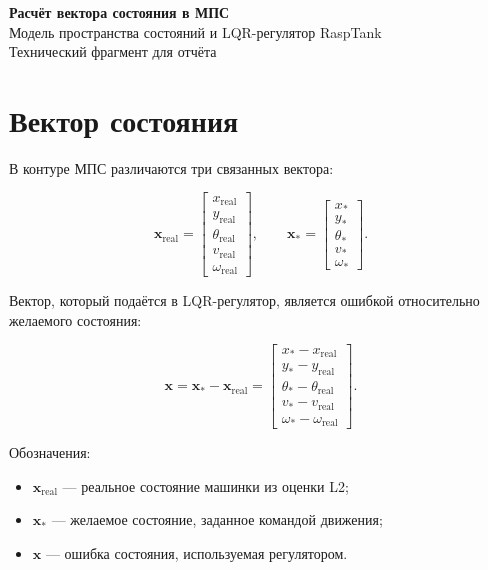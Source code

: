 \documentclass[12pt,a4paper]{article}
\newcommand{\vect}[1]{\mathbf{#1}}
\begin{document}
\begin{center}
  {\LARGE\bfseries Расчёт вектора состояния в МПС}\\[4pt]
  {\large Модель пространства состояний и LQR-регулятор RaspTank}\\[10pt]
  {\color{muted}Технический фрагмент для отчёта}
\end{center}

\vspace{8pt}

\section{Вектор состояния}

В контуре МПС различаются три связанных вектора:

\[
\vect{x}_{\mathrm{real}}
=
\begin{bmatrix}
x_{\mathrm{real}} \\
y_{\mathrm{real}} \\
\theta_{\mathrm{real}} \\
v_{\mathrm{real}} \\
\omega_{\mathrm{real}}
\end{bmatrix},
\qquad
\vect{x}_{*}
=
\begin{bmatrix}
x_{*} \\
y_{*} \\
\theta_{*} \\
v_{*} \\
\omega_{*}
\end{bmatrix}.
\]

Вектор, который подаётся в LQR-регулятор, является ошибкой относительно
желаемого состояния:

\[
\vect{x}
=
\vect{x}_{*} - \vect{x}_{\mathrm{real}}
=
\begin{bmatrix}
x_{*} - x_{\mathrm{real}} \\
y_{*} - y_{\mathrm{real}} \\
\theta_{*} - \theta_{\mathrm{real}} \\
v_{*} - v_{\mathrm{real}} \\
\omega_{*} - \omega_{\mathrm{real}}
\end{bmatrix}.
\]

Обозначения:

\begin{itemize}
  \item \(\vect{x}_{\mathrm{real}}\) — реальное состояние машинки из оценки L2;
  \item \(\vect{x}_{*}\) — желаемое состояние, заданное командой движения;
  \item \(\vect{x}\) — ошибка состояния, используемая регулятором.
\end{itemize}
\end{document}
